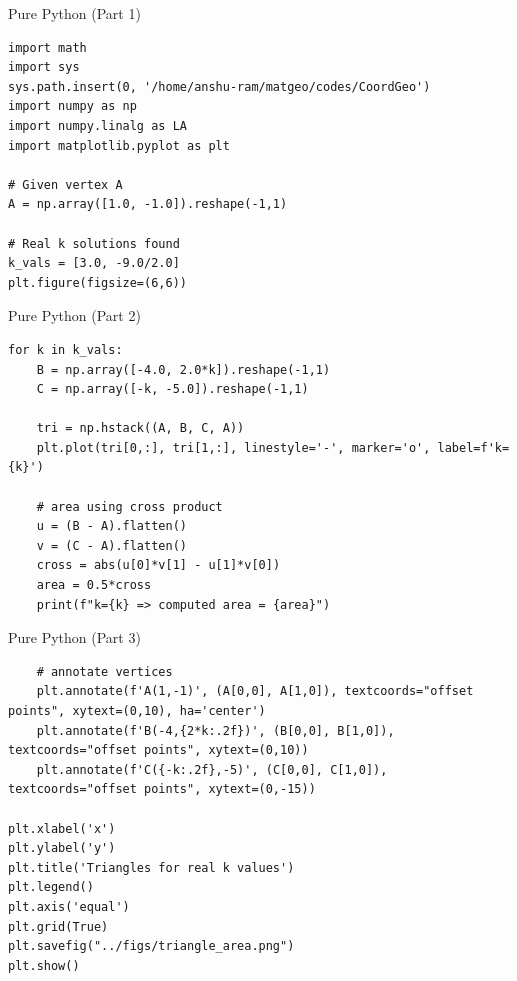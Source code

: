 \documentclass{beamer}
\begin{document}
\begin{frame}[fragile]{Pure Python (Part 1)}
\begin{lstlisting}
import math
import sys
sys.path.insert(0, '/home/anshu-ram/matgeo/codes/CoordGeo')
import numpy as np
import numpy.linalg as LA
import matplotlib.pyplot as plt

# Given vertex A
A = np.array([1.0, -1.0]).reshape(-1,1)

# Real k solutions found
k_vals = [3.0, -9.0/2.0]
plt.figure(figsize=(6,6))
\end{lstlisting}
\end{frame}

\begin{frame}[fragile]{Pure Python (Part 2)}
\begin{lstlisting}
for k in k_vals:
    B = np.array([-4.0, 2.0*k]).reshape(-1,1)
    C = np.array([-k, -5.0]).reshape(-1,1)
    
    tri = np.hstack((A, B, C, A))
    plt.plot(tri[0,:], tri[1,:], linestyle='-', marker='o', label=f'k={k}')
    
    # area using cross product
    u = (B - A).flatten()
    v = (C - A).flatten()
    cross = abs(u[0]*v[1] - u[1]*v[0])
    area = 0.5*cross
    print(f"k={k} => computed area = {area}")
\end{lstlisting}
\end{frame}

\begin{frame}[fragile]{Pure Python (Part 3)}
\begin{lstlisting}
    # annotate vertices
    plt.annotate(f'A(1,-1)', (A[0,0], A[1,0]), textcoords="offset points", xytext=(0,10), ha='center')
    plt.annotate(f'B(-4,{2*k:.2f})', (B[0,0], B[1,0]), textcoords="offset points", xytext=(0,10))
    plt.annotate(f'C({-k:.2f},-5)', (C[0,0], C[1,0]), textcoords="offset points", xytext=(0,-15))

plt.xlabel('x')
plt.ylabel('y')
plt.title('Triangles for real k values')
plt.legend()
plt.axis('equal')
plt.grid(True)
plt.savefig("../figs/triangle_area.png")
plt.show()
\end{lstlisting}
\end{frame}
\end{document}
